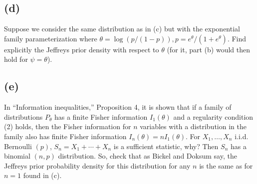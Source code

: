 \documentclass[11pt]{article}
\newcommand{\ProbS}{\iftrue}
\newcommand{\ProbE}{\fi}
\begin{document}
\subsection*{(d)}
\ProbS
Suppose we consider the same distribution as in (c) but with the exponential family parameterization where $\theta = \log(p/(1-p)), p=e^{\theta}/(1+e^{\theta})$. Find explicitly the Jeffreys prior density with respect to $\theta$ (for it, part (b) would then hold for $\psi = \theta$).
\ProbE

\subsection*{(e)}
\ProbS
In ``Information inequalities,'' Proposition 4, it is shown that if a family of distributions $P_{\theta}$ has a finite Fisher information $I_1(\theta)$ and a regularity condition (2) holds, then the Fisher information for $n$ variables with a distribution in the family also has finite Fisher information $I_{n}(\theta) = nI_1(\theta)$.
For $X_1, \dots, X_n$ i.i.d. Bernoulli $(p)$, $S_n = X_1 + \cdots + X_n$ is a sufficient statistic, why?
Then $S_n$ has a binomial $(n, p)$ distribution. So, check that as Bickel and Doksum say, the Jeffreys prior probability density for this distribution for any $n$ is the same as for $n=1$ found in (c).
\ProbE
\end{document}
